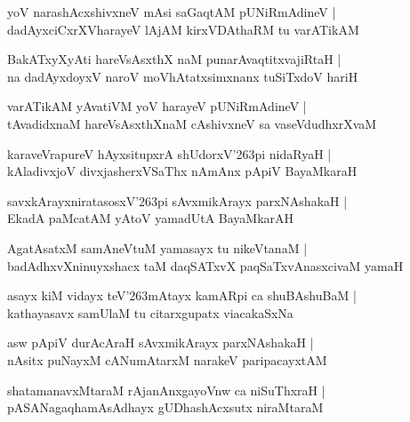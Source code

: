 \begin{shloka}
yoV narashAcxshivxneV mAsi saGaqtAM pUNiRmAdineV |\\
dadAyxciCxrXVharayeV lAjAM kirxVDAthaRM tu varATikAM 
\end{shloka}

\begin{shloka}
BakATxyXyAti hareVsAsxthX naM punarAvaqtitxvajiRtaH |\\
na dadAyxdoyxV naroV moVhAtatxsimxnanx tuSiTxdoV hariH 
\end{shloka}

\begin{shloka}
varATikAM yAvatiVM yoV harayeV pUNiRmAdineV |\\
tAvadidxnaM hareVsAsxthXnaM cAshivxneV sa vaseVdudhxrXvaM
\end{shloka}

\begin{shloka}
karaveVrapureV hAyxsitupxrA shUdorxV\char'263pi nidaRyaH |\\
kAladivxjoV divxjasherxVSaThx nAmAnx pApiV BayaMkaraH
\end{shloka}

\begin{shloka}
savxkArayxniratasosxV\char'263pi sAvxmikArayx parxNAshakaH |\\
EkadA paMcatAM yAtoV yamadUtA BayaMkarAH
\end{shloka}

\begin{shloka}
AgatAsatxM samAneVtuM yamasayx tu nikeVtanaM |\\
badAdhxvXninuyxshacx taM daqSATxvX paqSaTxvAnasxcivaM yamaH
\end{shloka}

\begin{shloka}
asayx kiM vidayx teV\char'263mAtayx kamARpi ca shuBAshuBaM |\\
kathayasavx samUlaM tu citarxgupatx viacakaSxNa
\end{shloka}

\begin{shloka}
asw pApiV durAcAraH sAvxmikArayx parxNAshakaH |\\
nAsitx puNayxM cANumAtarxM narakeV paripacayxtAM
\end{shloka}

\begin{shloka}
shatamanavxMtaraM rAjanAnxgayoVnw ca niSuThxraH |\\
pASANagaqhamAsAdhayx gUDhashAcxsutx niraMtaraM
\end{shloka}


